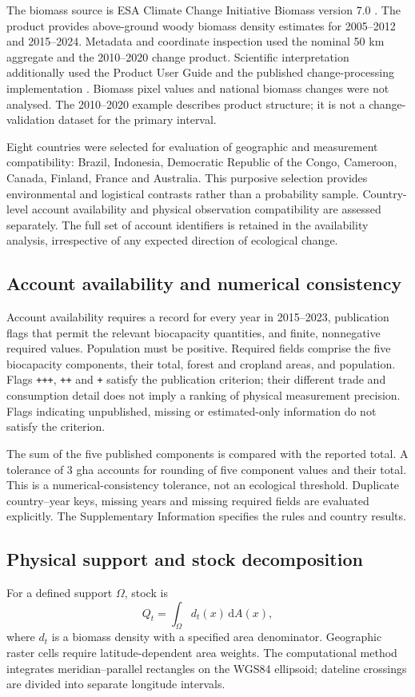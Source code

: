 \documentclass[11pt,a4paper]{article}
\begin{document}
The biomass source is ESA Climate Change Initiative Biomass version 7.0 \citep{SantoroCartus2026}. The product provides above-ground woody biomass density estimates for 2005--2012 and 2015--2024. Metadata and coordinate inspection used the nominal 50 km aggregate and the 2010--2020 change product. Scientific interpretation additionally used the Product User Guide and the published change-processing implementation \citep{PUG2026}. Biomass pixel values and national biomass changes were not analysed. The 2010--2020 example describes product structure; it is not a change-validation dataset for the primary interval.

Eight countries were selected for evaluation of geographic and measurement compatibility: Brazil, Indonesia, Democratic Republic of the Congo, Cameroon, Canada, Finland, France and Australia. This purposive selection provides environmental and logistical contrasts rather than a probability sample. Country-level account availability and physical observation compatibility are assessed separately. The full set of account identifiers is retained in the availability analysis, irrespective of any expected direction of ecological change.

\subsection{Account availability and numerical consistency}
Account availability requires a record for every year in 2015--2023, publication flags that permit the relevant biocapacity quantities, and finite, nonnegative required values. Population must be positive. Required fields comprise the five biocapacity components, their total, forest and cropland areas, and population. Flags \texttt{+++}, \texttt{++} and \texttt{+} satisfy the publication criterion; their different trade and consumption detail does not imply a ranking of physical measurement precision. Flags indicating unpublished, missing or estimated-only information do not satisfy the criterion.

The sum of the five published components is compared with the reported total. A tolerance of 3 gha accounts for rounding of five component values and their total. This is a numerical-consistency tolerance, not an ecological threshold. Duplicate country--year keys, missing years and missing required fields are evaluated explicitly. The Supplementary Information specifies the rules and country results.

\subsection{Physical support and stock decomposition}
For a defined support $\Omega$, stock is
\[
Q_t=\int_{\Omega} d_t(x)\,\mathrm dA(x),
\]
where $d_t$ is a biomass density with a specified area denominator. Geographic raster cells require latitude-dependent area weights. The computational method integrates meridian--parallel rectangles on the WGS84 ellipsoid; dateline crossings are divided into separate longitude intervals.
\end{document}
